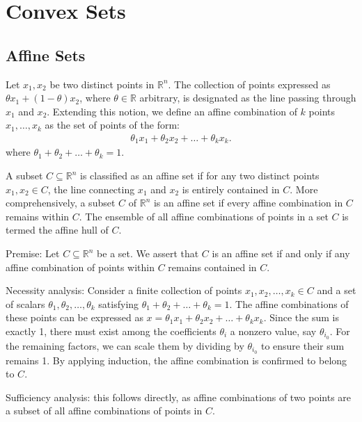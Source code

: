 \documentclass[a4paper, 12pt]{book}
\begin{document}
\chapter{Convex Sets}
\label{chap:convex_sets}

\section{Affine Sets}
\label{sec:affine_sets}
\begin{article}
    Let $x_1, x_2$ be two distinct points in $\mathbb{R}^n$. The collection of points expressed as $\theta x_1 + (1 - \theta) x_2$, where $\theta \in \mathbb{R}$ arbitrary, is designated as the line passing through $x_1$ and $x_2$. Extending this notion, we define an affine combination of $k$ points $x_1, \ldots, x_k$ as the set of points of the form:
    \begin{align}\label{eq:affine_combinations}
        \theta_1 x_1 + \theta_2 x_2 + \ldots + \theta_k x_k.
    \end{align}
    where $\theta_1 + \theta_2 + \ldots + \theta_k = 1$.
\end{article}

\begin{article}
    A subset $C \subseteq \mathbb{R}^n$ is classified as an affine set if for any two distinct points $x_1, x_2 \in C$, the line connecting $x_1$ and $x_2$ is entirely contained in $C$. More comprehensively, a subset $C$ of $\mathbb{R}^n$ is an affine set if every affine combination in $C$ remains within $C$.
    The ensemble of all affine combinations of points in a set $C$ is termed the affine hull of $C$.
\end{article}

\begin{article}
    Premise: Let $C \subseteq \mathbb{R}^n$ be a set. We assert that $C$ is an affine set if and only if any affine combination of points within $C$ remains contained in $C$.
    
    Necessity analysis: Consider a finite collection of points $x_1, x_2, \ldots, x_k \in C$ and a set of scalars $\theta_1, \theta_2, \dots, \theta_k$ satisfying $\theta_1 + \theta_2 + \ldots + \theta_k = 1$. The affine combinations of these points can be expressed as $x = \theta_1 x_1 + \theta_2 x_2 + \ldots + \theta_k x_k$. Since the sum is exactly 1, there must exist among the coefficients $\theta_i$ a nonzero value, say $\theta_{i_0}$. For the remaining factors, we can scale them by dividing by $\theta_{i_0}$ to ensure their sum remains 1. By applying induction, the affine combination is confirmed to belong to $C$.

    Sufficiency analysis: this follows directly, as affine combinations of two points are a subset of all affine combinations of points in $C$.
\end{article}
\end{document}
